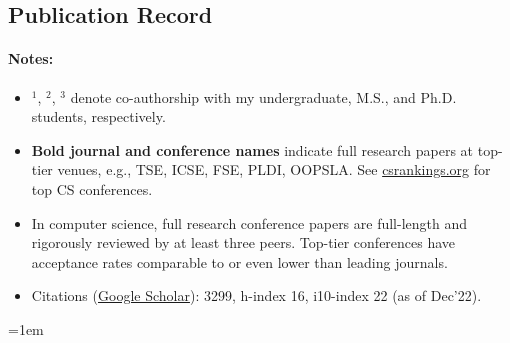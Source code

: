 \documentclass[11pt]{article}
\newcommand{\coe}[1]{\iftoggle{usecoe}{#1}{}}
\newcommand{\mygooglescholar}{\href{https://scholar.google.com/citations?user=TLcVQ-MAAAAJ}{Google Scholar}}
\newcommand{\mypubcc}[1]{\item~\label{#1} \fullcite{\detokenize{#1}c}}
\begin{document}
\subsection{Publication Record}

\paragraph{Notes:}
\begin{itemize}
\item \(^1\), \(^2\), \(^3\) denote co-authorship with my undergraduate, M.S., and Ph.D. students, respectively.
\item  \textbf{Bold journal and conference names} indicate full research papers at top-tier venues, e.g., TSE, ICSE, FSE, PLDI, OOPSLA. See \href{https://csrankings.org}{csrankings.org} for top CS conferences.
\item In computer science, full research conference papers are full-length and rigorously reviewed by at least three peers. Top-tier conferences have acceptance rates comparable to or even lower than leading journals.
\item Citations (\mygooglescholar{}): 3299, h-index 16, i10-index 22 (as of Dec'22).  
\end{itemize}

\emergencystretch=1em
\newcommand{\mybooks}{
  \begin{enumerate}
    \mypubcc{kapur2013geometric}
  \end{enumerate}
}

\newcommand{\myjournals}{
  \begin{enumerate}[label=J\arabic*]
    
    \mypubcc{nguyen2021using}
    \coe{\mypubcc{ishimwe2021dynaplex}}
    \coe{\mypubcc{le2020dynamite}}

    \coe{\mypubcc{mariano2019program}}

    \mypubcc{nguyen2014dig}

    \mypubcc{le2011genprog}
    \begin{itemize}
    \item \textbf{Featured Article}
    \item \textbf{1000+ citations}
    \end{itemize}
    
    \mypubcc{weimer2010automatic}
    \begin{itemize}
    \item \textbf{Research Highlight}
    \item \textbf{400+ citations}
    \end{itemize}
    
    \mypubcc{bui2008ant}
    \begin{itemize}
    \item \textbf{100+ citations}
    \end{itemize}
    
    \mypubcc{smith2007autonomous}
    
  \end{enumerate}
}
\end{document}

